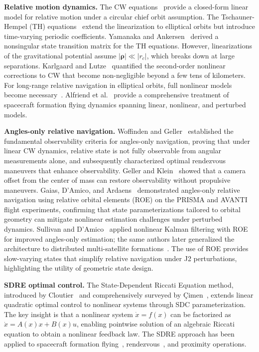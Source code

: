 \documentclass[preprint,3p,times]{elsarticle}
\begin{document}
\textbf{Relative motion dynamics.} The CW equations~\cite{Clohessy1960} provide a closed-form linear model for relative motion under a circular chief orbit assumption. The Tschauner-Hempel (TH) equations~\cite{Tschauner1965} extend the linearization to elliptical orbits but introduce time-varying periodic coefficients. Yamanaka and Ankersen~\cite{Yamanaka2002} derived a nonsingular state transition matrix for the TH equations. However, linearizations of the gravitational potential assume $|\boldsymbol{\rho}| \ll |r_c|$, which breaks down at large separations. Karlgaard and Lutze~\cite{Karlgaard2003} quantified the second-order nonlinear corrections to CW that become non-negligible beyond a few tens of kilometers. For long-range relative navigation in elliptical orbits, full nonlinear models become necessary~\cite{Dwidar2013}. Alfriend et al.~\cite{Alfriend2009} provide a comprehensive treatment of spacecraft formation flying dynamics spanning linear, nonlinear, and perturbed models.

\textbf{Angles-only relative navigation.} Woffinden and Geller~\cite{Woffinden2009,Woffinden2009b} established the fundamental observability criteria for angles-only navigation, proving that under linear CW dynamics, relative state is not fully observable from angular measurements alone, and subsequently characterized optimal rendezvous maneuvers that enhance observability. Geller and Klein~\cite{Geller2014} showed that a camera offset from the center of mass can restore observability without propulsive maneuvers. Gaias, D'Amico, and Ardaens~\cite{Gaias2014} demonstrated angles-only relative navigation using relative orbital elements (ROE) on the PRISMA and AVANTI flight experiments, confirming that state parameterizations tailored to orbital geometry can mitigate nonlinear estimation challenges under perturbed dynamics. Sullivan and D'Amico~\cite{Sullivan2017} applied nonlinear Kalman filtering with ROE for improved angles-only estimation; the same authors later generalized the architecture to distributed multi-satellite formations~\cite{Sullivan2021}. The use of ROE provides slow-varying states that simplify relative navigation under J2 perturbations, highlighting the utility of geometric state design.

\textbf{SDRE optimal control.} The State-Dependent Riccati Equation method, introduced by Cloutier~\cite{Cloutier1997} and comprehensively surveyed by \c{C}imen~\cite{Cimen2012,Cimen2010}, extends linear quadratic optimal control to nonlinear systems through SDC parameterization. The key insight is that a nonlinear system $\dot{x} = f(x)$ can be factorized as $\dot{x} = A(x)x + B(x)u$, enabling pointwise solution of an algebraic Riccati equation to obtain a nonlinear feedback law. The SDRE approach has been applied to spacecraft formation flying~\cite{Dwidar2013}, rendezvous~\cite{Tartaglia2016}, and proximity operations.
\end{document}

